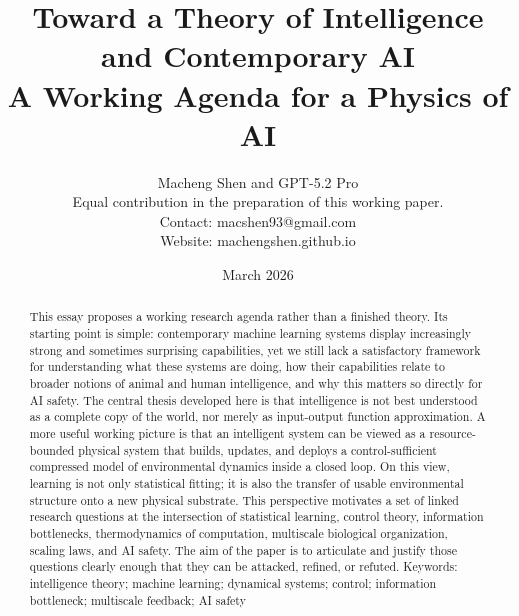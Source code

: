 \documentclass[11pt]{article}
\title{Toward a Theory of Intelligence and Contemporary AI\\\large A Working Agenda for a Physics of AI}
\author{Macheng Shen and GPT-5.2 Pro\\\small Equal contribution in the preparation of this working paper.\\\small Contact: macshen93@gmail.com\\\small Website: machengshen.github.io}
\date{March 2026}
\begin{document}
\maketitle
\begin{abstract}
This essay proposes a working research agenda rather than a finished theory. Its starting point is simple: contemporary machine learning systems display increasingly strong and sometimes surprising capabilities, yet we still lack a satisfactory framework for understanding what these systems are doing, how their capabilities relate to broader notions of animal and human intelligence, and why this matters so directly for AI safety. The central thesis developed here is that intelligence is not best understood as a complete copy of the world, nor merely as input-output function approximation. A more useful working picture is that an intelligent system can be viewed as a resource-bounded physical system that builds, updates, and deploys a control-sufficient compressed model of environmental dynamics inside a closed loop. On this view, learning is not only statistical fitting; it is also the transfer of usable environmental structure onto a new physical substrate. This perspective motivates a set of linked research questions at the intersection of statistical learning, control theory, information bottlenecks, thermodynamics of computation, multiscale biological organization, scaling laws, and AI safety. The aim of the paper is to articulate and justify those questions clearly enough that they can be attacked, refined, or refuted. Keywords: intelligence theory; machine learning; dynamical systems; control; information bottleneck; multiscale feedback; AI safety
\end{abstract}
\end{document}
